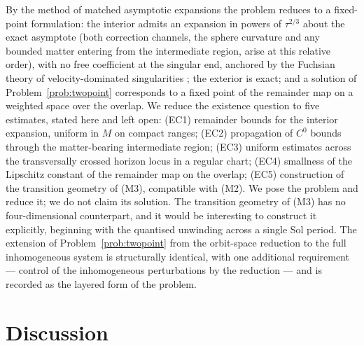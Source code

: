 \documentclass[11pt]{article}
\numberwithin{equation}{section}
\theoremstyle{plain}
\theoremstyle{definition}
\theoremstyle{remark}
\begin{document}
By the method of matched asymptotic expansions the problem reduces to
a fixed-point formulation: the interior admits an expansion in powers
of $\tau^{2/3}$ about the exact asymptote (both correction channels,
the sphere curvature and any bounded matter entering from the
intermediate region, arise at this relative order), with no free
coefficient at the singular end, anchored by the Fuchsian theory of
velocity-dominated singularities \cite{KichenassamyRendall1998,
AnderssonRendall2001}; the exterior is exact; and a solution of
Problem~\ref{prob:twopoint} corresponds to a fixed point of the
remainder map on a weighted space over the overlap. We reduce the
existence question to five estimates, stated here and left open:
(EC1) remainder bounds for the interior expansion, uniform in $M$ on
compact ranges; (EC2) propagation of $C^{0}$ bounds through the
matter-bearing intermediate region; (EC3) uniform estimates across the
transversally crossed horizon locus in a regular chart; (EC4)
smallness of the Lipschitz constant of the remainder map on the
overlap; (EC5) construction of the transition geometry of (M3),
compatible with (M2). We pose the problem and reduce it; we do not
claim its solution. The transition geometry of (M3) has no
four-dimensional counterpart, and it would be interesting to construct
it explicitly, beginning with the quantised unwinding across a single
Sol period. The extension of Problem~\ref{prob:twopoint} from
the orbit-space reduction to the full inhomogeneous system is
structurally identical, with one additional requirement --- control of
the inhomogeneous perturbations by the reduction --- and is recorded
as the layered form of the problem.

\section{Discussion}\label{sec:discussion}
\end{document}
